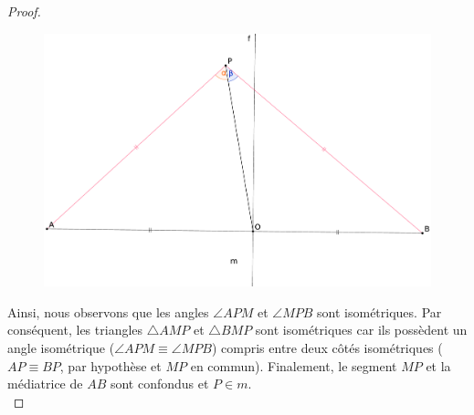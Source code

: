 \documentclass[a4paper,12pt]{article}
\begin{document}
\begin{enumerate}
\begin{proof}
       
        
        \begin{figure}[H]
        \centering
        \includegraphics[scale=0.17]{mediatrice2.eps}
    \end{figure}
        
        Ainsi, nous observons que les angles $\angle      APM$ et $\angle MPB$ sont isométriques.  Par conséquent, les triangles $\triangle AMP$ et $\triangle BMP$ sont isométriques      car ils possèdent un angle isométrique ($\angle APM \equiv \angle MPB$) compris entre deux côtés isométriques ($AP \equiv      BP$, par hypothèse et $MP$ en commun). Finalement, le segment $MP$ et la médiatrice de $AB$ sont confondus et $P \in m$.\\
        \end{proof}
\end{enumerate}
\end{document}
